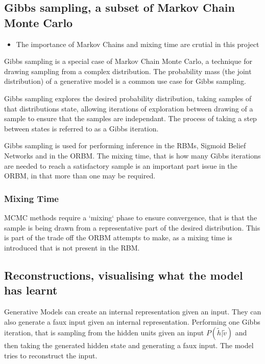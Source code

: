 \subsection{Gibbs sampling, a subset of Markov Chain Monte Carlo}

\begin{itemize}
  \item The importance of Markov Chains and mixing time are crutial in this project
\end{itemize}

Gibbs sampling is a special case of Markov Chain Monte Carlo, a technique for drawing sampling from a complex distribution. The probability mass (the joint distribution) of a generative model is a common use case for Gibbs sampling.

Gibbs sampling explores the desired probability distribution, taking samples of that distributions state, allowing iterations of exploration between drawing of a sample to ensure that the samples are independant. The process of taking a step between states is referred to as a Gibbs iteration.

Gibbs sampling is used for performing inference in the RBMs, Sigmoid Belief Networks and in the ORBM. The mixing time, that is how many Gibbs iterations are needed to reach a satisfactory sample is an important part issue in the ORBM, in that more than one may be required.

\subsubsection{Mixing Time}
MCMC methods require a `mixing` phase to ensure convergence, that is that the sample is being drawn from a representative part of the desired distribution. This is part of the trade off the ORBM attempts to make, as a mixing time is introduced that is not present in the RBM.

  \subsection{Reconstructions, visualising what the model has learnt}

  Generative Models can create an internal representation given an input. They can also generate a faux input given an internal representation. Performing one Gibbs iteration, that is sampling from the hidden units given an input $ P(\tilde{h}|\tilde{v}) $ and then taking the generated hidden state and generating a faux input. The model tries to reconstruct the input.

